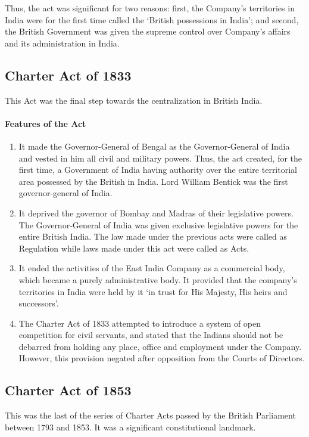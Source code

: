 \begin{multicols}{2}
Thus, the act was significant for two reasons: first, the Company's territories in India were for the first time called the `British possessions in India'; and second, the British Government was given the supreme control over Company's affairs and its administration in India.

\subsection{Charter Act of 1833}
This Act was the final step towards the centralization in British India.

\paragraph{Features of the Act}
\begin{enumerate}
  \item It made the Governor-General of Bengal as the Governor-General of India and vested in him all civil and military powers. Thus, the act created, for the first time, a Government of India having authority over the entire territorial area possessed by the British in India. Lord William Bentick was the first governor-general of India.
  \item It deprived the governor of Bombay and Madras of their legislative powers. The Governor-General of India was given exclusive legislative powers for the entire British India. The law made under the previous acts were called as Regulation while laws made under this act were called as Acts.
  \item It ended the activities of the East India Company as a commercial body, which became a purely administrative body. It provided that the company's territories in India were held by it `in trust for His Majesty, His heirs and successors'.
  \item The Charter Act of 1833 attempted to introduce a system of open competition for civil servants, and stated that the Indians should not be debarred from holding any place, office and employment under the Company. However, this provision negated after opposition from the Courts of Directors.
\end{enumerate}

\subsection{Charter Act of 1853}
This was the last of the series of Charter Acts passed by the British Parliament between 1793 and 1853. It was a significant constitutional landmark.

\end{multicols}
